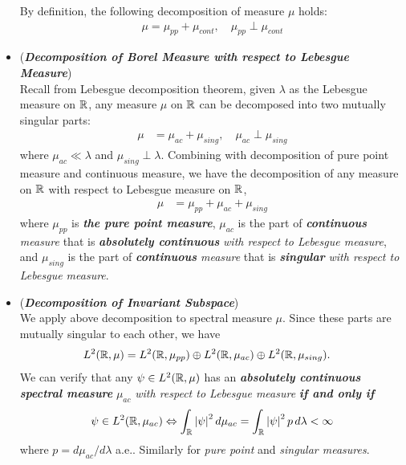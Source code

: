 \documentclass[11pt]{article}
\begin{document}
\begin{itemize}
\begin{definition}
By definition, the following decomposition of measure $\mu$ holds: 
\begin{align*}
\mu = \mu_{pp} + \mu_{cont}, \quad \mu_{pp} \perp \mu_{cont}
\end{align*}
\end{definition}

\item \begin{remark} (\emph{\textbf{Decomposition of Borel Measure with respect to Lebesgue Measure}})\\
Recall from Lebesgue decomposition theorem, given $\lambda$ as the Lebesgue measure on ${\mathbb R}$, any measure $\mu$ on ${\mathbb R}$ can be decomposed into two mutually singular parts:
\begin{align*}
 \mu &= \mu_{ac} + \mu_{sing}, \quad \mu_{ac} \perp \mu_{sing}
\end{align*} where $\mu_{ac} \ll \lambda$ and $\mu_{sing} \perp \lambda$. Combining with decomposition of pure point measure and continuous measure, we have the decomposition of any measure on ${\mathbb R}$ with respect to  Lebesgue measure on ${\mathbb R}$,
\begin{align}
 \mu &=\mu_{pp} + \mu_{ac} + \mu_{sing}  \label{eqn: measure_decomp_pp_ac_sing}
\end{align} where $\mu_{pp}$ is \emph{\textbf{the pure point measure}}, $\mu_{ac}$ is the part of \emph{\textbf{continuous} measure} that is \emph{\textbf{absolutely continuous}} \emph{with respect to Lebesgue measure}, and $ \mu_{sing}$ is the part of \emph{\textbf{continuous} measure} that is \emph{\textbf{singular}} \emph{with respect to Lebesgue measure}.
\end{remark}

\item \begin{remark}(\emph{\textbf{Decomposition of Invariant Subspace}})\\
We apply above decomposition to spectral measure $\mu$. Since these parts are mutually singular to each other, we have
\begin{align}
L^2({\mathbb R}, \mu) &= L^2({\mathbb R}, \mu_{pp}) \oplus L^2({\mathbb R}, \mu_{ac}) \oplus L^2({\mathbb R}, \mu_{sing}).
\end{align} 
We can verify that any $\psi \in L^2({\mathbb R}, \mu)$ has an \emph{\textbf{absolutely continuous spectral measure}} $\mu_{ac}$ \emph{with respect to Lebesgue measure} \emph{\textbf{if and only if}} 
\begin{align*}
\psi \in  L^2({\mathbb R}, \mu_{ac}) \Leftrightarrow \int_{{\mathbb R}} \left\lvert \psi \right\rvert^2 d\mu_{ac} =  \int_{{\mathbb R}} \left\lvert \psi \right\rvert^2  p \,d\lambda < \infty
\end{align*} where $p = d\mu_{ac}/d\lambda$ a.e.. Similarly for \emph{pure point} and \emph{singular measures}. 
\end{remark}


\end{itemize}
\end{document}
